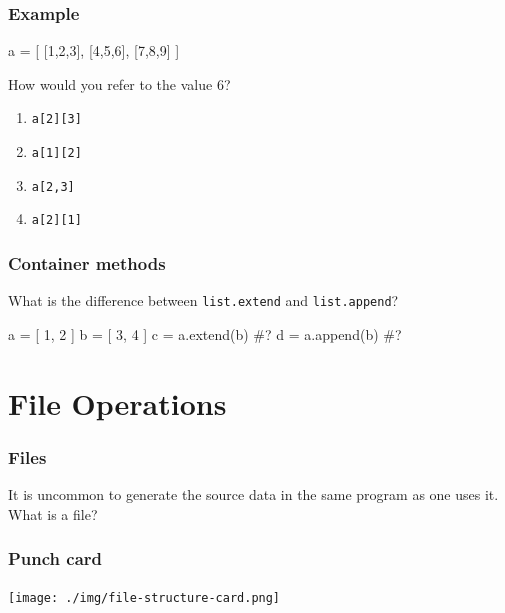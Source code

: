 \documentclass[11pt]{beamer}
\begin{document}
\begin{frame}[fragile]
  \frametitle{Example}
  \Enlarge

  \begin{semiverbatim}
a = [ [1,2,3], [4,5,6], [7,8,9] ]
  \end{semiverbatim}
  How would you refer to the value 6?
  \begin{enumerate}[label=\Alph*]
  \item  \texttt{a[2][3]}
  \item  \texttt{a[1][2]}
  \item  \texttt{a[2,3]}
  \item  \texttt{a[2][1]}
  \end{enumerate}
\end{frame}

\begin{frame}[fragile]
  \frametitle{Container methods}
  \Enlarge

  \begin{itemize}
  \myitem  What is the difference between \texttt{list.extend} and \texttt{list.append}?
  \end{itemize}
  \begin{semiverbatim}
a = [ 1, 2 ]
b = [ 3, 4 ]
c = a.extend(b)  #?
d = a.append(b)  #?
  \end{semiverbatim}
\end{frame}

\section{File Operations}

\begin{frame}[fragile]
  \frametitle{Files}
  \Enlarge

  \begin{itemize}
  \myitem  It is uncommon to generate the source data in the same program as one uses it.
  \myitem  What is a file?
  \end{itemize}
\end{frame}

\begin{frame}[fragile]
  \frametitle{Punch card}

  \texttt{[image: ./img/file-structure-card.png]}
\end{frame}
\end{document}
